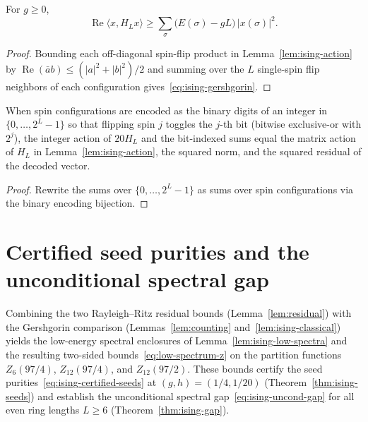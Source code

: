 \begin{lemma}
  \label{lem:ising-classical}
  \leanok
  For \(g \ge 0\),
  \begin{equation}
    \label{eq:ising-gershgorin}
    \operatorname{Re}\langle x, H_L x \rangle \ge \sum_\sigma \bigl(E(\sigma) - gL\bigr)\,
    |x(\sigma)|^2.
  \end{equation}
\end{lemma}
\begin{proof}
  \leanok
  Bounding each off-diagonal spin-flip product in Lemma~\ref{lem:ising-action} by
  \(\operatorname{Re}(\bar a b) \le (|a|^2 + |b|^2)/2\) and summing over the \(L\) single-spin flip
  neighbors of each configuration gives~\eqref{eq:ising-gershgorin}.
\end{proof}

\begin{lemma}
  \label{lem:ising-bridge}
  \leanok
  When spin configurations are encoded as the binary digits of an integer in
  \(\{0, \dots, 2^L - 1\}\) so that flipping spin \(j\) toggles the \(j\)-th bit (bitwise
  exclusive-or with \(2^j\)), the integer action of \(20 H_L\) and the bit-indexed sums equal the
  matrix action of \(H_L\) in Lemma~\ref{lem:ising-action}, the squared norm, and the squared
  residual of the decoded vector.
\end{lemma}
\begin{proof}
  \leanok
  Rewrite the sums over \(\{0, \dots, 2^L - 1\}\) as sums over spin configurations via the binary
  encoding bijection.
\end{proof}

\section{Certified seed purities and the unconditional spectral gap}

Combining the two Rayleigh--Ritz residual bounds (Lemma~\ref{lem:residual}) with the Gershgorin
comparison (Lemmas~\ref{lem:counting} and~\ref{lem:ising-classical}) yields the low-energy spectral
enclosures of Lemma~\ref{lem:ising-low-spectra} and the resulting two-sided
bounds~\eqref{eq:low-spectrum-z} on the partition functions \(Z_6(97/4)\), \(Z_{12}(97/4)\), and
\(Z_{12}(97/2)\). These bounds certify the seed purities~\eqref{eq:ising-certified-seeds} at
\((g, h) = (1/4, 1/20)\) (Theorem~\ref{thm:ising-seeds}) and establish the unconditional spectral
gap~\eqref{eq:ising-uncond-gap} for all even ring lengths \(L \ge 6\) (Theorem~\ref{thm:ising-gap}).

